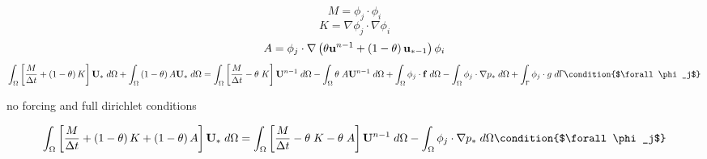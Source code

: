 \documentclass[11pt,a4paper]{article}
\begin{document}
\begin{dmath}
  M = \phi_j \cdot \phi_i 
\end{dmath}
\begin{dmath}
  K = \nabla \phi_j \cdot \nabla \phi_i
\end{dmath}
\begin{dmath}
  A = \phi_j \cdot \nabla \left( \theta {\bf u}^{n-1} + \left(1 - \theta \right) {\bf u}_{* - 1} \right) \phi_i
\end{dmath}
\begin{dmath}
  \int_\Omega \left [ \frac{M}{\Delta t} + \left(1 - \theta \right) K \right] {\bf U}_* \; d\Omega + \int_\Omega \left(1 - \theta \right) A {\bf U}_* \; d\Omega = \int_\Omega \left [ \frac{M}{\Delta t} - \theta \; K \right] {\bf U}^{n-1} \; d\Omega - \int_\Omega \theta \; A {\bf U}^{n-1} \; d\Omega + \int_\Omega \phi_j \cdot {\bf f} \; d\Omega - \int_\Omega \phi_j \cdot \nabla p_* \; d\Omega \\ + \int_\Upgamma \phi_j \cdot g \; d\Upgamma \condition{$\forall \phi_j$}
\end{dmath}

no forcing and full dirichlet conditions


\begin{dmath}
  \int_\Omega \left [ \frac{M}{\Delta t} + \left(1 - \theta \right) K + \left(1 - \theta \right) A \right] {\bf U}_* \; d\Omega = \int_\Omega \left [ \frac{M}{\Delta t} - \theta \; K - \theta \; A \right] {\bf U}^{n-1} \; d\Omega - \int_\Omega \phi_j \cdot \nabla p_* \; d\Omega \condition{$\forall \phi_j$}
\end{dmath}
\end{document}
